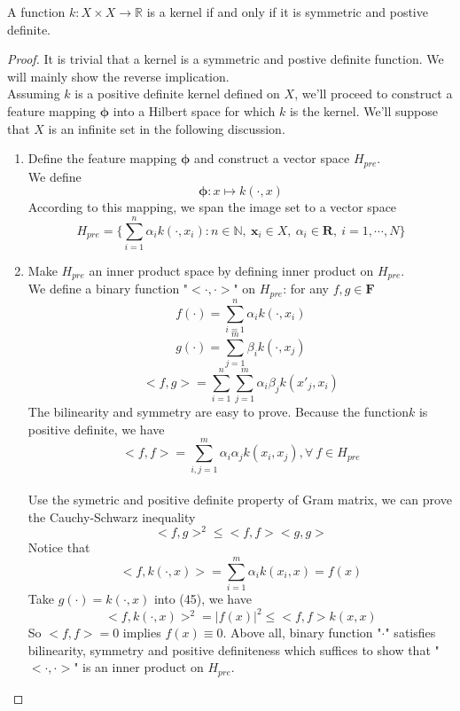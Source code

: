 \begin{theorem}
A function $k:X\times X \rightarrow \mathbb{R}$ is a kernel if and only if it is symmetric and postive definite.
\end{theorem}
\begin{proof}
It is trivial that a kernel is a symmetric and postive definite function. We will mainly show the reverse implication.\\
Assuming $k$ is a positive definite kernel defined on $X$, we'll proceed to construct a feature mapping $\bm\phi$ into a Hilbert space for which $k$ is the kernel. We'll suppose that $X$ is an infinite set in the following discussion.
\begin{enumerate}
	\item Define the feature mapping $\bm\phi$ and construct a vector space $H_{pre}$.\\
	We define
	$$\bm\phi:x\longmapsto k(\cdot,x)$$
	According to this mapping, we span the image set to a vector space
	$$H_{pre}=\Big\{\sum_{i=1}^{n}\alpha_{i}k(\cdot,x_{i}):n\in\mathbb{N},\ \bm x_{i}\in X,~\alpha_{i}\in\mathbf{R},~i=1,\cdots,N \Big\}$$
	\item Make $H_{pre}$ an inner product space by defining inner product on $H_{pre}$.\\
	We define a binary function "$<\cdot,\cdot>$" on $H_{pre}$: for any $f,g\in \bm F$
	$$ f(\cdot)=\sum_{i=1}^{n}\alpha_{i}k(\cdot,x_{i}) $$
	$$ g(\cdot)=\sum_{j=1}^{m}\beta_{i}k(\cdot,x_{j}) $$
	$$ <f,g>=\sum_{i=1}^{n}\sum_{j=1}^{m}\alpha_{i}\beta_{j}k(x'_{j},x_{i}) $$
	The bilinearity and symmetry are easy to prove. Because the function$k$ is positive definite, we have
	$$ <f,f>=\sum_{i,j=1}^{m}\alpha_{i}\alpha_{j}k(x_{i},x_{j}),\forall\ f\in H_{pre} $$\\
	Use the symetric and positive definite property of Gram matrix, we can prove the Cauchy-Schwarz inequality
	\begin{equation}
	<f,g>^2\leqslant<f,f><g,g>
	\end{equation}
	Notice that
	\begin{equation}\label{reproducing property}
	<f, k(\cdot,x)>=\sum_{i=1}^{m}\alpha_{i}k(x_{i},x)=f(x)
	\end{equation}
	Take $g(\cdot)=k(\cdot,x)$ into (45), we have
	$$ <f,k(\cdot,x)>^2=|f(x)|^2\leq <f,f>k(x,x) $$
	So $<f,f>=0$ implies $f(x)\equiv 0$.
	Above all, binary function "$\bm\cdot$" satisfies bilinearity, symmetry and positive definiteness which suffices to show that "$<\cdot,\cdot>$" is an inner product on $H_{pre}$. \\

\end{enumerate}
\end{proof}
